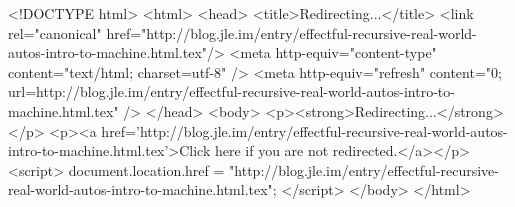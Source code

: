 <!DOCTYPE html>
<html>
<head>
<title>Redirecting...</title>
<link rel="canonical" href="http://blog.jle.im/entry/effectful-recursive-real-world-autos-intro-to-machine.html.tex"/>
<meta http-equiv="content-type" content="text/html; charset=utf-8" />
<meta http-equiv="refresh" content="0; url=http://blog.jle.im/entry/effectful-recursive-real-world-autos-intro-to-machine.html.tex" />
</head>
<body>
  <p><strong>Redirecting...</strong></p>
  <p><a href='http://blog.jle.im/entry/effectful-recursive-real-world-autos-intro-to-machine.html.tex'>Click here if you are not redirected.</a></p>
  <script>
    document.location.href = "http://blog.jle.im/entry/effectful-recursive-real-world-autos-intro-to-machine.html.tex";
  </script>
</body>
</html>
